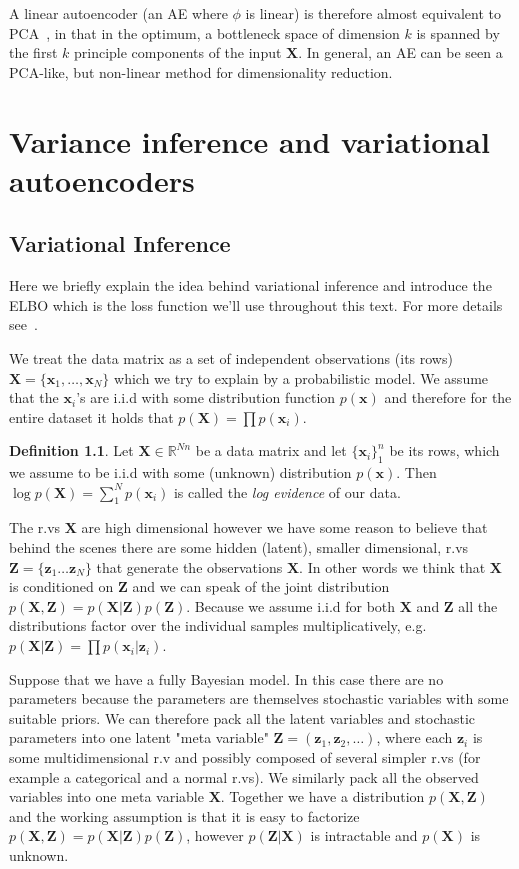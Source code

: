 \documentclass[11pt, a4paper]{report}
\theoremstyle{plain}
\theoremstyle{definition}
\newtheorem{mydef}{Definition}[chapter]
\theoremstyle{remark}
\newcommand{\R}{\mathbb{R}}
\newcommand{\bv}[1]{\boldsymbol{#1}}
\begin{document}
A linear autoencoder (an AE where $\phi$ is linear) is therefore almost equivalent to
PCA~\cite{plaut2018principal}, in that in the optimum, a bottleneck space of dimension $k$
is spanned by the first $k$ principle components of the input $\bv{X}$.
In general, an AE can be seen a PCA-like, but non-linear method for
dimensionality reduction.

\chapter{Variance inference and variational autoencoders}
\section{Variational Inference}

Here we briefly explain the idea behind variational inference and introduce the
ELBO which is the loss function we'll use throughout this text.
For more details see~.

We treat the data matrix as a set of independent observations (its rows)
$\bv{X} = \{\bv{x}_1, \dots
, \bv{x}_N\}$ which we try to explain by a probabilistic model. 
We assume that
the $\bv{x}_i$'s are i.i.d with some distribution function $p(\bv{x})$ and therefore for
the entire dataset it holds that $p(\bv{X}) = \prod p(\bv{x}_i)$.

\begin{mydef}
\label{def:logevidence}
Let $\bv{X} \in \R^{Nn}$ be a data matrix and let $\{\bv{x}_i\}_1^n$ be its
rows, which we assume to be i.i.d with some (unknown) distribution $p(\bv{x})$.
Then $\log p(\bv{X}) = \sum_1^N p(\bv{x}_i)$ is called the \emph{log evidence} of our
data.
\end{mydef}

The r.vs $\bv{X}$ are high dimensional however
we have some reason to believe that behind the scenes there are some hidden
(latent), smaller dimensional, r.vs
$\bv{Z} = \{\bv{z}_1 \dots \bv{z}_N\}$ that generate the observations $\bv{X}$.
In other words we think that $\bv{X}$ is conditioned on $\bv{Z}$ and we can speak of
the joint distribution $p(\bv{X},\bv{Z}) = p(\bv{X}|\bv{Z})p(\bv{Z})$.
Because we assume i.i.d for both $\bv{X}$ and $\bv{Z}$ all the distributions factor
over the individual samples multiplicatively, e.g.
$p(\bv{X}|\bv{Z}) = \prod p(\bv{x}_i | \bv{z}_i)$.

Suppose that we have a fully Bayesian model. In this case there are no
parameters because the parameters are themselves stochastic variables with some
suitable priors. We can therefore pack all the latent variables and stochastic
parameters into one latent "meta variable" $\bv{Z} = (\bv{z}_1, \bv{z}_2, \dots )$,
where each $\bv{z}_i$
is some multidimensional r.v and possibly composed of several simpler r.vs (for
example a categorical and a normal r.vs).
We similarly pack all the observed variables into one meta variable $\bv{X}$.
Together we have a distribution $p(\bv{X},\bv{Z})$ and the working assumption is that it
is easy to factorize $p(\bv{X},\bv{Z}) = p(\bv{X}|\bv{Z})p(\bv{Z})$,
however $p(\bv{Z}|\bv{X})$ is intractable and
$p(\bv{X})$ is unknown.
\end{document}
